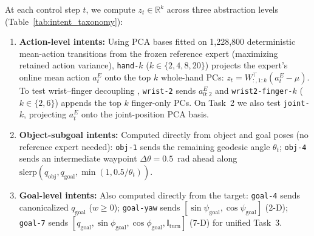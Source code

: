 At each control step $t$, we compute $z_t \in \mathbb{R}^k$ across three abstraction levels (Table~\ref{tab:intent_taxonomy}):
\begin{enumerate}[leftmargin=1.5em,itemsep=1.5pt,topsep=2pt]
  \item \textbf{Action-level intents:} Using PCA bases fitted on 1,228,800 deterministic mean-action transitions from the frozen reference expert (maximizing retained action variance), \texttt{hand-$k$} ($k \in \{2,4,8,20\}$) projects the expert's online mean action $a_t^E$ onto the top $k$ whole-hand PCs: $z_t = W_{:,1:k}^\top (a_t^E - \mu)$. To test wrist--finger decoupling \citep{liu2016analysis}, \texttt{wrist-2} sends $a^E_{0:2}$ and \texttt{wrist2-finger-$k$} ($k \in \{2,6\}$) appends the top $k$ finger-only PCs. On Task~2 we also test \texttt{joint-$k$}, projecting $a_t^E$ onto the joint-position PCA basis.
  \item \textbf{Object-subgoal intents:} Computed directly from object and goal poses (no reference expert needed): \texttt{obj-1} sends the remaining geodesic angle $\theta_t$; \texttt{obj-4} sends an intermediate waypoint $\Delta\theta = 0.5$~rad ahead along $\mathrm{slerp}(q_{\mathrm{obj}}, q_{\mathrm{goal}}, \min(1, 0.5/\theta_t))$.
  \item \textbf{Goal-level intents:} Also computed directly from the target: \texttt{goal-4} sends canonicalized $q_{\mathrm{goal}}$ ($w \ge 0$); \texttt{goal-yaw} sends $[\sin\psi_{\mathrm{goal}}, \cos\psi_{\mathrm{goal}}]$ (2-D); \texttt{goal-7} sends $[q_{\mathrm{goal}}, \sin\phi_{\mathrm{goal}}, \cos\phi_{\mathrm{goal}}, \mathbb{I}_{\mathrm{turn}}]$ (7-D) for unified Task~3.
\end{enumerate}

